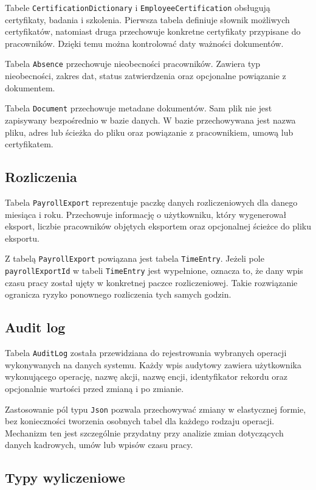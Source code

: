 Tabele \texttt{CertificationDictionary} i \texttt{EmployeeCertification} obsługują certyfikaty, badania i szkolenia. Pierwsza tabela definiuje słownik możliwych certyfikatów, natomiast druga przechowuje konkretne certyfikaty przypisane do pracowników. Dzięki temu można kontrolować daty ważności dokumentów.

Tabela \texttt{Absence} przechowuje nieobecności pracowników. Zawiera typ nieobecności, zakres dat, status zatwierdzenia oraz opcjonalne powiązanie z dokumentem.

Tabela \texttt{Document} przechowuje metadane dokumentów. Sam plik nie jest zapisywany bezpośrednio w bazie danych. W bazie przechowywana jest nazwa pliku, adres lub ścieżka do pliku oraz powiązanie z pracownikiem, umową lub certyfikatem.

\subsection{Rozliczenia}

Tabela \texttt{PayrollExport} reprezentuje paczkę danych rozliczeniowych dla danego miesiąca i roku. Przechowuje informację o użytkowniku, który wygenerował eksport, liczbie pracowników objętych eksportem oraz opcjonalnej ścieżce do pliku eksportu.

Z tabelą \texttt{PayrollExport} powiązana jest tabela \texttt{TimeEntry}. Jeżeli pole \texttt{payrollExportId} w tabeli \texttt{TimeEntry} jest wypełnione, oznacza to, że dany wpis czasu pracy został ujęty w konkretnej paczce rozliczeniowej. Takie rozwiązanie ogranicza ryzyko ponownego rozliczenia tych samych godzin.

\subsection{Audit log}

Tabela \texttt{AuditLog} została przewidziana do rejestrowania wybranych operacji wykonywanych na danych systemu. Każdy wpis audytowy zawiera użytkownika wykonującego operację, nazwę akcji, nazwę encji, identyfikator rekordu oraz opcjonalnie wartości przed zmianą i po zmianie.

Zastosowanie pól typu \texttt{Json} pozwala przechowywać zmiany w elastycznej formie, bez konieczności tworzenia osobnych tabel dla każdego rodzaju operacji. Mechanizm ten jest szczególnie przydatny przy analizie zmian dotyczących danych kadrowych, umów lub wpisów czasu pracy.

\subsection{Typy wyliczeniowe}

